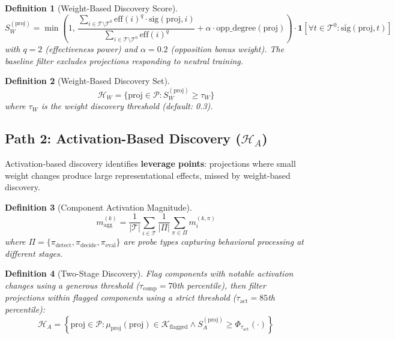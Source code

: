\documentclass[11pt]{article}
\newtheorem{definition}{Definition}[section]
\begin{document}
\begin{definition}[Weight-Based Discovery Score]
\begin{equation}
S^{(\text{proj})}_W = \min\left(1,\, \frac{\sum_{i \in \mathcal{T} \setminus \mathcal{T}^0} \text{eff}(i)^q \cdot \text{sig}(\text{proj}, i)}{\sum_{i \in \mathcal{T} \setminus \mathcal{T}^0} \text{eff}(i)^q} + \alpha \cdot \text{opp\_degree}(\text{proj})\right) \cdot \mathbf{1}\left[\forall t \in \mathcal{T}^0: \overline{\text{sig}}(\text{proj}, t)\right]
\end{equation}
with $q=2$ (effectiveness power) and $\alpha=0.2$ (opposition bonus weight). The baseline filter excludes projections responding to neutral training.
\end{definition}

\begin{definition}[Weight-Based Discovery Set]
\begin{equation}
\mathcal{H}_W = \{\text{proj} \in \mathcal{P} : S^{(\text{proj})}_W \geq \tau_W\}
\end{equation}
where $\tau_W$ is the weight discovery threshold (default: 0.3).
\end{definition}

\subsection{Path 2: Activation-Based Discovery ($\mathcal{H}_A$)}

Activation-based discovery identifies \textbf{leverage points}: projections where small weight changes produce large representational effects, missed by weight-based discovery.

\begin{definition}[Component Activation Magnitude]
\begin{equation}
m^{(k)}_{\text{agg}} = \frac{1}{|\mathcal{T}|} \sum_{i \in \mathcal{T}} \frac{1}{|\Pi|} \sum_{\pi \in \Pi} m^{(k,\pi)}_i
\end{equation}
where $\Pi = \{\pi_{\text{detect}}, \pi_{\text{decide}}, \pi_{\text{eval}}\}$ are probe types capturing behavioral processing at different stages.
\end{definition}

\begin{definition}[Two-Stage Discovery]
Flag components with notable activation changes using a generous threshold ($\tau_{\text{comp}} = 70$th percentile), then filter projections within flagged components using a strict threshold ($\tau_{\text{act}} = 85$th percentile):
\begin{equation}
\mathcal{H}_A = \left\{\text{proj} \in \mathcal{P} : \mu_{\text{proj}}(\text{proj}) \in \mathcal{K}_{\text{flagged}} \land S^{(\text{proj})}_A \geq \Phi_{\tau_{\text{act}}}(\cdot)\right\}
\end{equation}
\end{definition}
\end{document}
